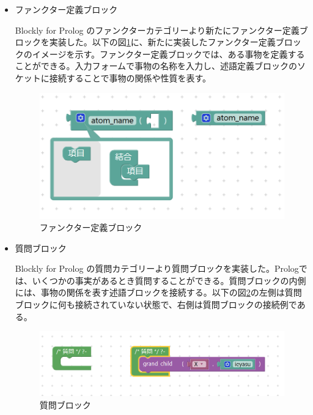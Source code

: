 \documentclass{risepaper}
\begin{document}
\begin{itemize}
\item ファンクター定義ブロック

Blockly for Prolog のファンクターカテゴリーより新たにファンクター定義ブロックを実装した。以下の図\ref{fig:prolog_functor}に、新たに実装したファンクター定義ブロックのイメージを示す。ファンクター定義ブロックでは、ある事物を定義することができる。入力フォームで事物の名称を入力し、述語定義ブロックのソケットに接続することで事物の関係や性質を表す。

\begin{figure}[h]
\begin{center}
\includegraphics[scale=0.5]{img/prolog_functor.PNG}
\caption{ファンクター定義ブロック}%
\label{fig:prolog_functor}
\end{center}%
\end{figure}%

\item 質問ブロック

Blockly for Prolog の質問カテゴリーより質問ブロックを実装した。Prologでは、いくつかの事実があるとき質問することができる。質問ブロックの内側には、事物の関係を表す述語ブロックを接続する。以下の図\ref{fig:prolog_question}の左側は質問ブロックに何も接続されていない状態で、右側は質問ブロックの接続例である。

\begin{figure}[h]
\begin{center}
\includegraphics[scale=0.5]{img/prolog_question.PNG}
\caption{質問ブロック}%
\label{fig:prolog_question}
\end{center}%
\end{figure}%

\end{itemize} 
\end{document}
